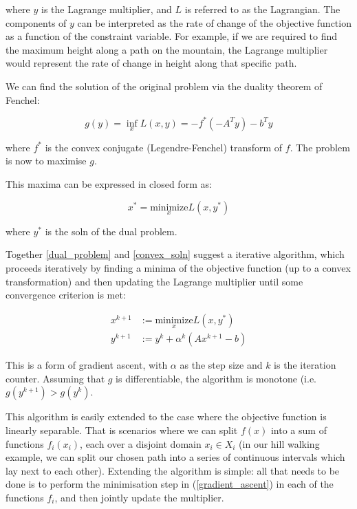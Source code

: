 \documentclass[titlepage]{article}
\begin{document}
where \(y\) is the Lagrange multiplier, and \(L\) is referred to as the Lagrangian. The components of \(y\) can be interpreted as the rate of change of the objective function as a function of the constraint variable. For example, if we are required to find the maximum height along a path on the mountain, the Lagrange multiplier would represent the rate of change in height along that specific path. 

We can find the solution of the original problem via the duality theorem of Fenchel:

\begin{equation}
g\left(y\right) = \inf_x L\left(x,y\right) = -f^*\left(-A^Ty\right) -b^Ty
\label{dual_problem}
\end{equation}

where \(f^*\) is the convex conjugate (Legendre-Fenchel) transform of \(f\). The problem is now to maximise \(g\). 

This maxima can be expressed in closed form as:

\begin{equation}
x^* = \underset{x}{\text{minimize}} L\left(x, y^*\right) 
\label{convex_soln}
\end{equation}

where \(y^*\) is the soln of the dual problem. 

Together \ref{dual_problem} and \ref{convex_soln} suggest a iterative algorithm, which proceeds iteratively by finding a minima of the objective function (up to a convex transformation) and then updating the Lagrange multiplier until some convergence criterion is met: 

\begin{align}
x^{k+1} &:= \underset{x}{\text{minimize}} L\left(x, y^*\right)  \\
y^{k+1} &:= y^{k} + \alpha^k \left(Ax^{k+1} - b\right)
\label{gradient_ascent}
\end{align}

This is a form of gradient ascent, with \( \alpha \) as the step size and \(k\) is the iteration counter. Assuming that \(g\) is differentiable, the algorithm is monotone (i.e. \( g\left(y^{k+1}\right) > g\left(y^{k}\right)\).

This algorithm is easily extended to the case where the objective function is linearly separable. That is scenarios where we can split \(f\left(x\right)\) into a sum of functions \(f_i\left(x_i\right)\), each over a disjoint domain \(x_i \in X_i\) (in our hill walking example, we can split our chosen path into a series of continuous intervals which lay next to each other). Extending the algorithm is simple: all that needs to be done is to perform the minimisation step in (\ref{gradient_ascent}) in each of the functions \(f_i\), and then jointly update the multiplier.
\end{document}
